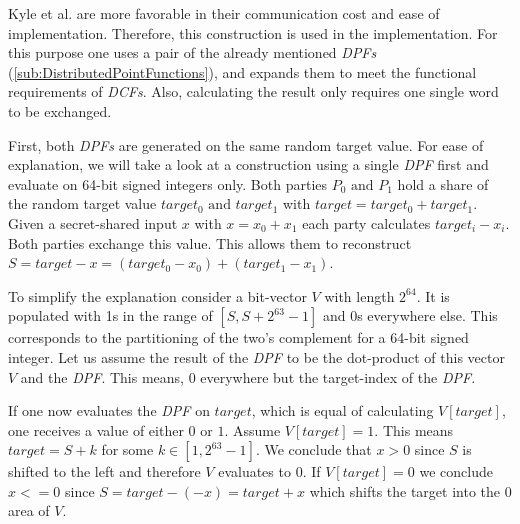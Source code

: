Kyle et al. \cite{kyle2023grotto} are more favorable in their communication cost and ease of implementation.
Therefore, this construction is used in the implementation.
For this purpose one uses a pair of the already mentioned \textit{DPFs} (\ref{sub:DistributedPointFunctions}), and expands them to meet the functional requirements of \textit{DCFs}.
Also, calculating the result only requires one single word to be exchanged.

First, both \textit{DPFs} are generated on the same random target value.
For ease of explanation, we will take a look at a construction using a single \textit{DPF} first and evaluate on 64-bit signed integers only.
Both parties $P_0 \text{ and }P_1$ hold a share of the random target value $target_0\text{ and } target_1$ with $target = target_0+target_1$.
Given a secret-shared input $x$ with $x=x_0+x_1$ each party calculates $target_i-x_i$.
Both parties exchange this value.
This allows them to reconstruct $S=target-x=(target_0-x_0)+(target_1-x_1)$.

To simplify the explanation consider a bit-vector $V$ with length $2^{64}$.
It is populated with 1s in the range of $[S,S+2^{63}-1]$ and 0s everywhere else.
This corresponds to the partitioning of the two's complement for a 64-bit signed integer.
Let us assume the result of the \textit{DPF} to be the dot-product of this vector $V$ and the \textit{DPF}.
This means, 0 everywhere but the target-index of the \textit{DPF}.

If one now evaluates the \textit{DPF} on $target$, which is equal of calculating $V[target]$, one receives a value of either $0$ or $1$.
Assume $V[target]=1$.
This means $target = S+k$ for some $k\in [1,2^{63}-1]$.
We conclude that $x>0$ since $S$ is shifted to the left and therefore $V$ evaluates to $0$.
If $V[target]=0$ we conclude $x<=0$ since $S=target-(-x) = target + x$ which shifts the target into the $0$ area of $V$.